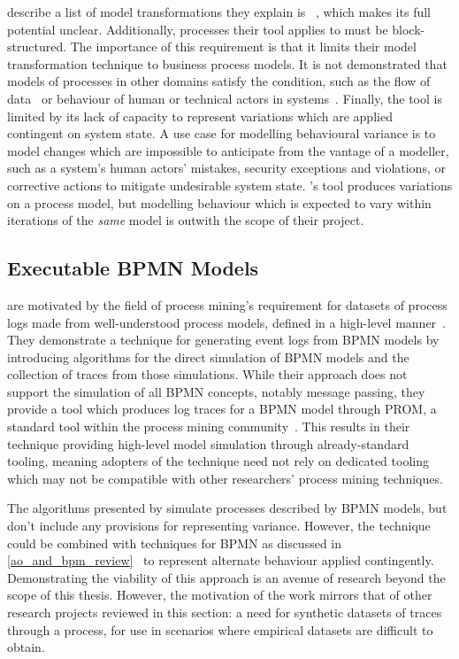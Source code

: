 \citeauthor{pourmasoumi2015business} describe a list of model transformations
they explain is ~\cite{pourmasoumi2015business}, which makes its full potential
unclear. Additionally, processes their tool applies to must be block-structured.
The importance of this requirement is that it limits their model transformation
technique to business process models. It is not demonstrated that models of
processes in other domains satisfy the condition, such as the flow of
data~\cite{obashimethodology} or behaviour of human or technical actors in
\sociotechnical systems~\cite{wallis2018caise}. Finally, the tool is limited by
its lack of capacity to represent variations which are applied contingent on
system state. A use case for modelling behavioural variance is to model changes
which are impossible to anticipate from the vantage of a modeller, such as a
\sociotechnical system's human actors' mistakes, security exceptions and
violations, or corrective actions to mitigate undesirable system state.
\citeauthor{pourmasoumi2015business}'s tool produces variations on a process
model, but modelling behaviour which is expected to vary within iterations of
the \emph{same} model is outwith the scope of their project.



\subsection{Executable BPMN Models}

\citeauthor{ExecutableBPMNMitsyuk} are motivated by the field of process
mining's requirement for datasets of process logs made from well-understood
process models, defined in a high-level manner~\cite{ExecutableBPMNMitsyuk}.
They demonstrate a technique for generating event logs from BPMN models by
introducing algorithms for the direct simulation of BPMN models and the
collection of traces from those simulations. While their approach does not
support the simulation of all BPMN concepts, notably message passing, they
provide a tool which produces log traces for a BPMN model through PROM, a
standard tool within the process mining community~\cite{van2005prom}. This
results in their technique providing high-level model simulation through
already-standard tooling, meaning adopters of the technique need not rely on
dedicated tooling which may not be compatible with other researchers' process
mining techniques.

The algorithms presented by \citeauthor{ExecutableBPMNMitsyuk} simulate
processes described by BPMN models, but don't include any provisions for
representing variance. However, the technique could be combined with
\aspectorientation{} techniques for BPMN as discussed in
\cref{ao_and_bpm_review}~\cite{charfi2010AO4BPMN,Cappelli_AOBPM} to represent
alternate behaviour applied contingently. Demonstrating the viability of this
approach is an avenue of research beyond the scope of this thesis. However, the
motivation of the work mirrors that of other research projects reviewed in this
section: a need for synthetic datasets of traces through a process, for use in
scenarios where empirical datasets are difficult to obtain.


